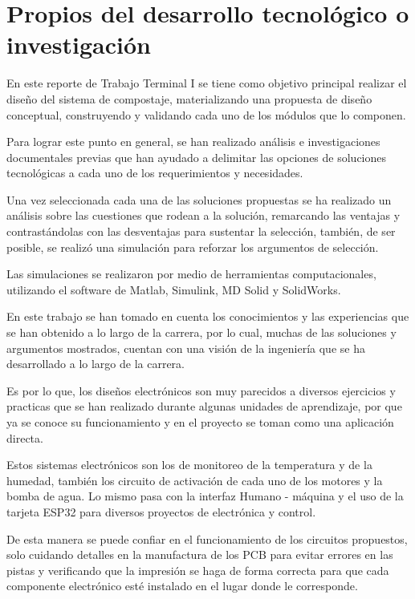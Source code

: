 \section{Propios del desarrollo tecnológico o investigación}

En este reporte de Trabajo Terminal I se tiene como objetivo principal realizar el diseño del sistema de compostaje, materializando una propuesta de diseño conceptual, construyendo y validando cada uno de los módulos que lo componen.

Para lograr este punto en general, se han realizado análisis  e investigaciones documentales previas que han ayudado a delimitar las opciones de soluciones tecnológicas a cada uno de los requerimientos y necesidades.

Una vez seleccionada cada una de las soluciones propuestas se ha realizado un análisis sobre las cuestiones que rodean a la solución, remarcando las ventajas y contrastándolas con las desventajas para sustentar la selección, también, de ser posible, se realizó una simulación para reforzar los argumentos de selección.

Las simulaciones se realizaron por medio de herramientas computacionales, utilizando el software de Matlab, Simulink, MD Solid y SolidWorks.

En este trabajo se han tomado en cuenta los conocimientos y las experiencias que se han obtenido a lo largo de la carrera, por lo cual, muchas de las soluciones y argumentos mostrados, cuentan con una visión de la ingeniería que se ha desarrollado a lo largo de la carrera.

Es por lo que, los diseños electrónicos son muy parecidos a diversos ejercicios y practicas que se han realizado durante algunas unidades de aprendizaje, por que ya se conoce su funcionamiento y en el proyecto se toman como una aplicación directa.

Estos sistemas electrónicos son los de monitoreo de la temperatura y de la humedad, también los circuito de activación de cada uno de los motores y la bomba de agua. Lo mismo pasa con la interfaz Humano - máquina y el uso de la tarjeta ESP32 para diversos proyectos de electrónica y control.

De esta manera se puede confiar en el funcionamiento de los circuitos propuestos, solo cuidando detalles en la manufactura de los PCB para evitar errores en las pistas y verificando que la impresión se haga de forma correcta para que cada componente electrónico esté instalado en el lugar donde le corresponde.

